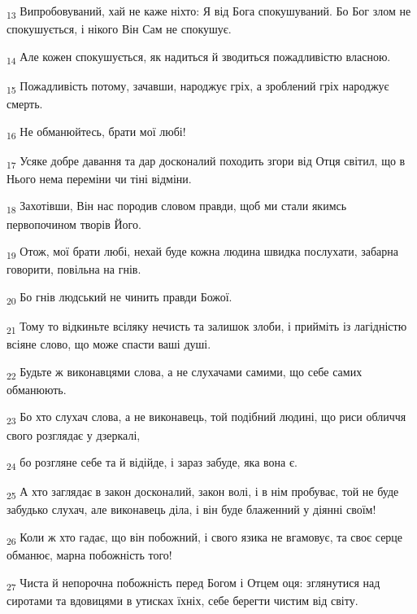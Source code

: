 \begin{tcolorbox}
\textsubscript{13} Випробовуваний, хай не каже ніхто: Я від Бога спокушуваний. Бо Бог злом не спокушується, і нікого Він Сам не спокушує.
\end{tcolorbox}
\begin{tcolorbox}
\textsubscript{14} Але кожен спокушується, як надиться й зводиться пожадливістю власною.
\end{tcolorbox}
\begin{tcolorbox}
\textsubscript{15} Пожадливість потому, зачавши, народжує гріх, а зроблений гріх народжує смерть.
\end{tcolorbox}
\begin{tcolorbox}
\textsubscript{16} Не обманюйтесь, брати мої любі!
\end{tcolorbox}
\begin{tcolorbox}
\textsubscript{17} Усяке добре давання та дар досконалий походить згори від Отця світил, що в Нього нема переміни чи тіні відміни.
\end{tcolorbox}
\begin{tcolorbox}
\textsubscript{18} Захотівши, Він нас породив словом правди, щоб ми стали якимсь первопочином творів Його.
\end{tcolorbox}
\begin{tcolorbox}
\textsubscript{19} Отож, мої брати любі, нехай буде кожна людина швидка послухати, забарна говорити, повільна на гнів.
\end{tcolorbox}
\begin{tcolorbox}
\textsubscript{20} Бо гнів людський не чинить правди Божої.
\end{tcolorbox}
\begin{tcolorbox}
\textsubscript{21} Тому то відкиньте всіляку нечисть та залишок злоби, і прийміть із лагідністю всіяне слово, що може спасти ваші душі.
\end{tcolorbox}
\begin{tcolorbox}
\textsubscript{22} Будьте ж виконавцями слова, а не слухачами самими, що себе самих обманюють.
\end{tcolorbox}
\begin{tcolorbox}
\textsubscript{23} Бо хто слухач слова, а не виконавець, той подібний людині, що риси обличчя свого розглядає у дзеркалі,
\end{tcolorbox}
\begin{tcolorbox}
\textsubscript{24} бо розгляне себе та й відійде, і зараз забуде, яка вона є.
\end{tcolorbox}
\begin{tcolorbox}
\textsubscript{25} А хто заглядає в закон досконалий, закон волі, і в нім пробуває, той не буде забудько слухач, але виконавець діла, і він буде блаженний у діянні своїм!
\end{tcolorbox}
\begin{tcolorbox}
\textsubscript{26} Коли ж хто гадає, що він побожний, і свого язика не вгамовує, та своє серце обманює, марна побожність того!
\end{tcolorbox}
\begin{tcolorbox}
\textsubscript{27} Чиста й непорочна побожність перед Богом і Отцем оця: зглянутися над сиротами та вдовицями в утисках їхніх, себе берегти чистим від світу.
\end{tcolorbox}
